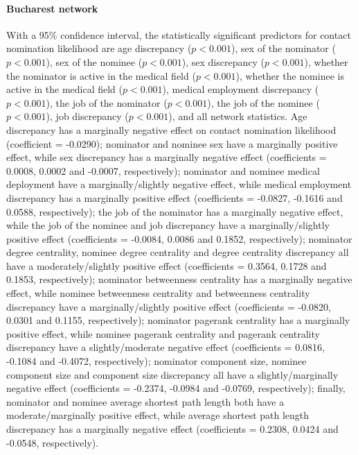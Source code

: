 \paragraph{Bucharest network} With a 95\% confidence interval, the statistically significant predictors for contact nomination likelihood are age discrepancy ($p<0.001$), sex of the nominator ($p<0.001$), sex of the nominee ($p<0.001$), sex discrepancy ($p<0.001$), whether the nominator is active in the medical field ($p<0.001$), whether the nominee is active in the medical field ($p<0.001$), medical employment discrepancy ($p<0.001$), the job of the nominator ($p<0.001$), the job of the nominee ($p<0.001$), job discrepancy ($p<0.001$), and all network statistics. Age discrepancy has a marginally negative effect on contact nomination likelihood (coefficient = -0.0290); nominator and nominee sex have a marginally positive effect, while sex discrepancy has a marginally negative effect (coefficients = 0.0008, 0.0002 and -0.0007, respectively); nominator and nominee medical deployment have a marginally/slightly negative effect, while medical employment discrepancy has a marginally positive effect (coefficients = -0.0827, -0.1616 and 0.0588, respectively); the job of the nominator has a marginally negative effect, while the job of the nominee and job discrepancy have a marginally/slightly positive effect (coefficients = -0.0084, 0.0086 and 0.1852, respectively); nominator degree centrality, nominee degree centrality and degree centrality discrepancy all have a moderately/slightly positive effect (coefficients = 0.3564, 0.1728 and 0.1853, respectively); nominator betweenness centrality has a marginally negative effect, while nominee betweenness centrality and betweenness centrality discrepancy have a marginally/slightly positive effect (coefficients = -0.0820, 0.0301 and 0.1155, respectively); nominator pagerank centrality has a marginally positive effect, while nominee pagerank centrality and pagerank centrality discrepancy have a slightly/moderate negative effect (coefficients = 0.0816, -0.1084 and -0.4072, respectively); nominator component size, nominee component size and component size discrepancy all have a slightly/marginally negative effect (coefficients = -0.2374, -0.0984 and -0.0769, respectively); finally, nominator and nominee average shortest path length both have a moderate/marginally positive effect, while average shortest path length discrepancy has a marginally negative effect (coefficients = 0.2308, 0.0424 and -0.0548, respectively).

